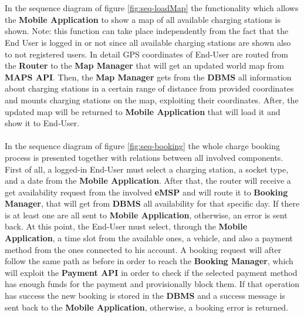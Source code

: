 \documentclass[a4paper]{report}
\begin{document}
\\\\
In the sequence diagram of figure \ref{fig:seq-loadMap} the functionality which allows the \textbf{Mobile Application} to show a map of all available charging stations is shown. Note: this function can take place independently from the fact that the End User is logged in or not since all available charging stations are shown also to not registered users. In detail GPS coordinates of End-User are routed from the \textbf{Router} to the \textbf{Map Manager} that will get an updated world map from \textbf{MAPS API}. Then, the \textbf{Map Manager} gets from the \textbf{DBMS} all information about charging stations in a certain range of distance from provided coordinates and mounts charging stations on the map, exploiting their coordinates. After, the updated map will be returned to \textbf{Mobile Application} that will load it and show it to End-User.
\\\\
In the sequence diagram of figure \ref{fig:seq-booking} the whole charge booking process is presented together with relations between all involved components. First of all, a logged-in End-User must select a charging station, a socket type, and a date from the \textbf{Mobile Application}. After that, the router will receive a get availability request from the involved \textbf{eMSP} and will route it to \textbf{Booking Manager}, that will get from \textbf{DBMS} all availability for that specific day. If there is at least one are all sent to \textbf{Mobile Application}, otherwise, an error is sent back. At this point, the End-User must select, through the \textbf{Mobile Application}, a time slot from the available ones, a vehicle, and also a payment method from the ones connected to his account. A booking request will after follow the same path as before in order to reach the \textbf{Booking Manager}, which will exploit the \textbf{Payment API} in order to check if the selected payment method has enough funds for the payment and provisionally block them. If that operation has success the new booking is stored in the \textbf{DBMS} and a success message is sent back to the \textbf{Mobile Application}, otherwise, a booking error is returned.
\\\\
\end{document}
